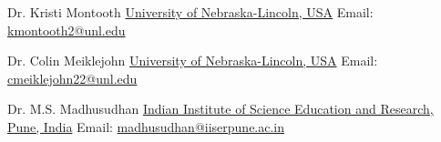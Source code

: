 

\begin{cventries}

  \eduentry
    {Dr. Kristi Montooth}  %
    {\href{https://biosci.unl.edu/}{University of Nebraska-Lincoln, USA}}  %
    {Email: \href{mailto:kmontooth2@unl.edu}{kmontooth2@unl.edu}}  %
    {}  %

  \vspace{2.0mm} %

  \eduentry
    {Dr. Colin Meiklejohn}  %
    {\href{https://biosci.unl.edu/}{University of Nebraska-Lincoln, USA}}  %
    {Email: \href{mailto:cmeiklejohn2@unl.edu}{cmeiklejohn22@unl.edu}}  %
    {}  %

  \vspace{2.0mm} %
  
  \eduentry
    {Dr. M.S. Madhusudhan}  %
	{\href{https://www.iiserpune.ac.in/}{Indian Institute of Science Education and Research, Pune, India}} %
	{Email: \href{mailto:madhusudhan@iiserpune.ac.in}{madhusudhan@iiserpune.ac.in}}  %
    {}  %


\end{cventries}